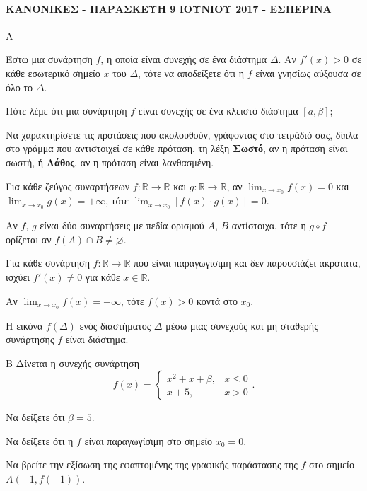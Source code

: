 \paragraph{ΚΑΝΟΝΙΚΕΣ - ΠΑΡΑΣΚΕΥΗ 9 ΙΟΥΝΙΟΥ 2017 - ΕΣΠΕΡΙΝΑ}
\begin{thema}{Α}
\begin{erwthma}
    \item Έστω μια συνάρτηση $f$, η οποία είναι συνεχής σε ένα διάστημα $\Delta$. Αν $f'(x) > 0$ σε κάθε εσωτερικό σημείο $x$ του $\Delta$, τότε να αποδείξετε ότι η $f$ είναι γνησίως αύξουσα σε όλο το $\Delta$. 
    \item Πότε λέμε ότι μια συνάρτηση $f$ είναι συνεχής σε ένα κλειστό διάστημα $[a, \beta]$; 
    \item Να χαρακτηρίσετε τις προτάσεις που ακολουθούν, γράφοντας στο τετράδιό σας, δίπλα στο γράμμα που αντιστοιχεί σε κάθε πρόταση, τη λέξη \textbf{Σωστό}, αν η πρόταση είναι σωστή, ή \textbf{Λάθος}, αν η πρόταση είναι λανθασμένη.
    \begin{alist}
        \item Για κάθε ζεύγος συναρτήσεων $f : \mathbb{R} \to \mathbb{R}$ και $g : \mathbb{R} \to \mathbb{R}$, αν $\displaystyle\lim_{x \to x_0} f(x) = 0$ και $\displaystyle\lim_{x \to x_0} g(x) = +\infty$, τότε $\displaystyle\lim_{x \to x_0} [f(x) \cdot g(x)] = 0$.
        \item Αν $f$, $g$ είναι δύο συναρτήσεις με πεδία ορισμού $A$, $B$ αντίστοιχα, τότε η $g \circ f$ ορίζεται αν $f(A) \cap B \neq \varnothing$.
        \item Για κάθε συνάρτηση $f : \mathbb{R} \to \mathbb{R}$ που είναι παραγωγίσιμη και δεν παρουσιάζει ακρότατα, ισχύει $f'(x) \neq 0$ για κάθε $x \in \mathbb{R}$.
        \item Αν $\displaystyle\lim_{x \to x_0} f(x) = -\infty$, τότε $f(x) > 0$ κοντά στο $x_0$.
        \item Η εικόνα $f(\Delta)$ ενός διαστήματος $\Delta$ μέσω μιας συνεχούς και μη σταθερής συνάρτησης $f$ είναι διάστημα.
    \end{alist} 
\end{erwthma}
\end{thema}
\begin{thema}{Β}
Δίνεται η συνεχής συνάρτηση
\[
f(x) = \begin{cases} x^2 + x + \beta, & x \leq 0 \\ x + 5, & x > 0 \end{cases}.
\]
\begin{erwthma}
    \item Να δείξετε ότι $\beta = 5$. 
    \item Να δείξετε ότι η $f$ είναι παραγωγίσιμη στο σημείο $x_0 = 0$. 
    \item Να βρείτε την εξίσωση της εφαπτομένης της γραφικής παράστασης της $f$ στο σημείο $A(-1, f(-1))$. 
\end{erwthma}
\end{thema}
